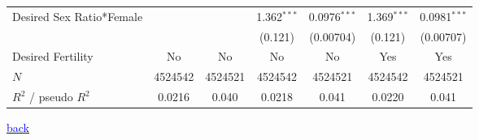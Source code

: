 \documentclass[10pt,letterpaper,subeqn]{beamer}
\begin{document}
\begin{frame}[label=DSRIMR]
\begin{table}[h!]
{\begin{tabular}{l*{6}{c}}
Desired Sex Ratio*Female&                     &                     &       1.362$^{***}$&      0.0976$^{***}$&       1.369$^{***}$&      0.0981$^{***}$\\
            &                     &                     &     (0.121)         &   (0.00704)         &     (0.121)         &   (0.00707)         \\


\hline
Desired Fertility&     No         &         No         &     No         &     No         &     Yes         &         Yes         \\
\hline
\(N\)       &     4524542         &     4524521         &     4524542         &     4524521         &     4524542         &     4524521         \\
$R^{2}$  / pseudo $R^{2}$& 0.0216  &       0.040         & 0.0218             &       0.041         &     0.0220          &       0.041         \\
\bottomrule
\end{tabular}}
\end{table}
{\footnotesize \hyperlink{DSR}{\textcolor{blue}{back}}}
\end{frame}
\end{document}
